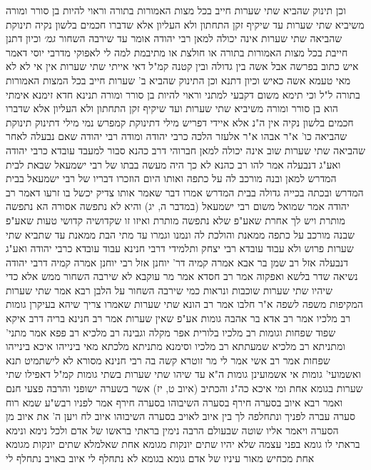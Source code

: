 \documentclass[12pt, openany]{book}
\begin{document}
{וכן תינוק שהביא שתי שערות חייב בכל מצות האמורות בתורה וראוי להיות בן סורר ומורה משיביא שתי שערות עד שיקיף זקן 
התחתון ולא העליון אלא שדברו חכמים בלשון נקיה 
תינוקת שהביאה שתי שערות אינה יכולה למאן  רבי יהודה אומר  עד שירבה השחור
{\large\emph{גמ׳}} וכיון דתנן חייבת בכל מצות האמורות בתורה או חולצת או מתיבמת למה לי
לאפוקי מדרבי יוסי דאמר  איש כתוב בפרשה אבל אשה בין גדולה ובין קטנה קמ"ל  דאי אייתי שתי שערות אין אי לא לא  מאי טעמא  אשה כאיש
וכיון דתנא וכן התינוק שהביא ב' שערות חייב בכל המצות האמורות בתורה ל"ל 
וכי תימא  משום דקבעי למתני וראוי להיות בן סורר ומורה תנינא חדא זימנא  אימתי הוא בן סורר ומורה משיביא שתי שערות ועד שיקיף זקן התחתון ולא העליון אלא שדברו חכמים בלשון נקיה 
אין ה"נ אלא איידי דפריש מילי דתינוקת קמפרש נמי מילי דתינוק
תינוקת שהביאה כו' א"ר אבהו א"ר אלעזר  הלכה כרבי יהודה 
ומודה רבי יהודה שאם נבעלה לאחר שהביאה שתי שערות שוב אינה יכולה למאן 
חברוהי דרב כהנא סבור למעבד עובדא כרבי יהודה ואע"ג דנבעלה 
אמר להו רב כהנא  לא כך היה מעשה בבתו של רבי ישמעאל שבאת לבית המדרש למאן ובנה מורכב לה על כתפה  ואותו היום הוזכרו דבריו של רבי ישמעאל בבית המדרש ובכתה בכייה גדולה בבית המדרש 
אמרו  דבר שאמר אותו צדיק יכשל בו זרעו 
דאמר רב יהודה אמר שמואל משום רבי ישמעאל  (במדבר ה, יג) והיא לא נתפשה אסורה הא נתפשה מותרת  ויש לך אחרת שאע"פ שלא נתפשה מותרת ואיזו זו שקדושיה קדושי טעות שאע"פ שבנה מורכב על כתפה ממאנת והולכת לה 
ונמנו וגמרו  עד מתי הבת ממאנת עד שתביא שתי שערות  פרוש ולא עבוד עובדא 
רבי יצחק ותלמידי דרבי חנינא עבוד עובדא כרבי יהודה ואע"ג דנבעלה  אזל רב שמן בר אבא אמרה קמיה דר' יוחנן אזל רבי יוחנן אמרה קמיה דרבי יהודה נשיאה  שדר בלשא ואפקוה 
אמר רב חסדא אמר מר עוקבא  לא שירבה השחור ממש אלא כדי שיהיו שתי שערות שוכבות ונראות כמי שירבה השחור על הלבן  רבא אמר  שתי שערות המקיפות משפה לשפה 
א"ר חלבו אמר רב הונא  שתי שערות שאמרו צריך שיהא בעיקרן גומות  רב מלכיו אמר רב אדא בר אהבה  גומות אע"פ שאין שערות 
אמר רב חנינא בריה דרב איקא  שפוד שפחות וגומות רב מלכיו  בלורית אפר מקלה וגבינה רב מלכיא 
רב פפא אמר  מתני' ומתניתא רב מלכיא שמעתתא רב מלכיו וסימנא  מתניתא מלכתא 
מאי בינייהו  איכא בינייהו שפחות 
אמר רב אשי אמר לי מר זוטרא קשה בה רבי חנינא מסורא  לא לישתמיט תנא ואשמועי' גומות  אי אשמועינן גומות ה"א  עד שיהו שתי שערות בשתי גומות קמ"ל דאפילו שתי שערות בגומא אחת 
ומי איכא כה"ג  והכתיב (איוב ט, יז) אשר בשערה ישופני והרבה פצעי חנם ואמר רבא  איוב בסערה חירף בסערה השיבוהו  בסערה חירף אמר לפניו  רבש"ע שמא רוח סערה עברה לפניך ונתחלפה לך בין איוב לאויב  בסערה השיבוהו {איוב לח } ויען ה' את
איוב מן הסערה ויאמר אליו  שוטה שבעולם הרבה נימין בראתי בראשו של אדם ולכל נימא ונימא בראתי לו גומא בפני עצמה שלא יהיו שתים יונקות מגומא אחת שאלמלא שתים יונקות מגומא אחת מכחיש מאור עיניו של אדם  גומא בגומא לא נתחלף לי איוב באויב נתחלף לי 
}
\end{document}
